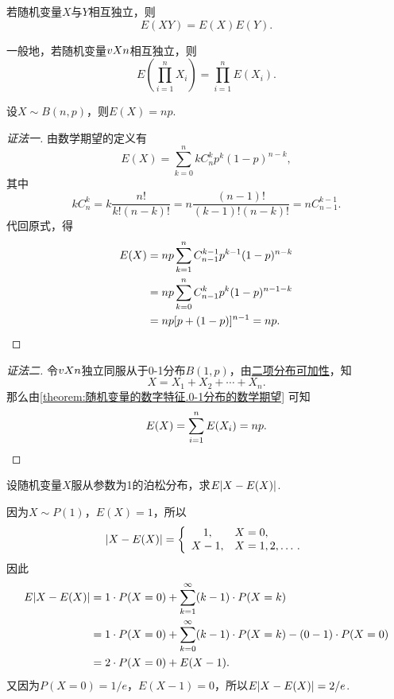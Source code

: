 \begin{property}\label{theorem:随机变量的数字特征.数学期望的性质3}
若随机变量\(X\)与\(Y\)相互独立，则\[
E(X Y) = E(X) E(Y).
\]

一般地，若随机变量\(v{X}{n}\)相互独立，则\[
E\left( \prod_{i=1}^n{X_i} \right)
= \prod_{i=1}^n{E(X_i)}.
\]
\end{property}

\begin{theorem}
设\(X \sim B(n,p)\)，则\(E(X) = np\).
\begin{proof}[证法一]
由数学期望的定义有\[
E(X) = \sum\limits_{k=0}^n k C_n^k p^k (1-p)^{n-k},
\]其中\[
k C_n^k = k \frac{n!}{k! (n-k)!}
= n \frac{(n-1)!}{(k-1)! (n-k)!}
= n C_{n-1}^{k-1}.
\]代回原式，得\begin{align*}
E(X) &= np \sum\limits_{k=1}^n C_{n-1}^{k-1} p^{k-1} (1-p)^{n-k} \\
&= np \sum\limits_{k=0}^n C_{n-1}^k p^k (1-p)^{n-1-k} \\
&= np[p+(1-p)]^{n-1} = np.
\qedhere
\end{align*}
\end{proof}
\begin{proof}[证法二]
令\(v{X}{n}\)独立同服从于0-1分布\(B(1,p)\)，由\hyperref[theorem:多维随机变量及其分布.二项分布的可加性3]{二项分布可加性}，知\[
X = X_1 + X_2 + \dotsb + X_n.
\]那么由\cref{theorem:随机变量的数字特征.0-1分布的数学期望} 可知\[
E(X) = \sum\limits_{i=1}^n E(X_i) = np.
\qedhere
\]
\end{proof}
\end{theorem}

\begin{example}
设随机变量\(X\)服从参数为1的泊松分布，求\(E\abs{X-E(X)}\).
\begin{solution}
因为\(X \sim P(1)\)，\(E(X) = 1\)，所以\[
\abs{X-E(X)} = \left\{ \begin{array}{cl}
1, & X=0, \\
X - 1, & X=1,2,\dotsc.
\end{array} \right.
\]因此\begin{align*}
E\abs{X-E(X)}
&= 1 \cdot P(X=0)
+ \sum\limits_{k=1}^{\infty} (k-1) \cdot P(X=k) \\
&= 1 \cdot P(X=0)
+ \sum\limits_{k=0}^{\infty} (k-1) \cdot P(X=k)
- (0-1) \cdot P(X=0) \\
&= 2 \cdot P(X=0)
+ E(X-1).
\end{align*}
又因为\(P(X=0)=1/e\)，\(E(X-1) = 0\)，所以\(E\abs{X-E(X)} = 2/e\).
\end{solution}
\end{example}


